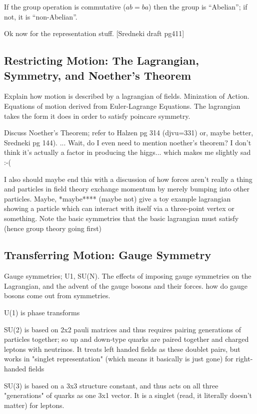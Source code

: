         If the group operation is commutative ($ab=ba$) then the group is ``Abelian''; if not, it is ``non-Abelian''.

        Ok now for the representation stuff. [Sredneki draft pg411]

        \cite{Cheng_book}

    \subsection{Restricting Motion: The Lagrangian, Symmetry, and Noether's Theorem}

        Explain how motion is described by a lagrangian of fields. 
        Minization of Action.
        Equations of motion derived from Euler-Lagrange Equations.
        The lagrangian takes the form it does in order to satisfy poincare symmetry.

        Discuss Noether's Theorem; refer to Halzen pg 314 (djvu=331) or, maybe better, Sredneki pg 144).
            ... Wait, do I even need to mention noether's theorem?
            I don't think it's actually a factor in producing the higgs... which makes me slightly sad :-(

        I also should maybe end this with a discussion of how forces aren't really a thing
            and particles in field theory exchange momentum by merely bumping into other particles.
        Maybe, *maybe**** (maybe not) give a toy example lagrangian showing a particle which can interact with itself via a three-point vertex or something.
        Note the basic symmetries that the basic lagrangian must satisfy (hence group theory going first)
        \cite{Halzen_book}


    \subsection{Transferring Motion: Gauge Symmetry}

        Gauge symmetries; U1, SU(N).
        The effects of imposing gauge symmetries on the Lagrangian, and the advent of the gauge bosons and their forces.
        how do gauge bosons come out from symmetries.

        U(1) is phase transforms

        SU(2) is based on 2x2 pauli matrices and thus requires pairing generations of particles together;
            so up and down-type quarks are paired together and charged leptons with neutrinos.
        It treats left handed fields as these doublet pairs,
            but works in "singlet representation" (which means it basically is just gone) for right-handed fields

        SU(3) is based on a 3x3 structure constant, and thus acts on all three "generations" of quarks as one 3x1 vector.
        It is a singlet (read, it literally doesn't matter) for leptons.
        
        \cite{Osborn_notes}
        \cite{Peskin_book}
        \cite{Halzen_book}
